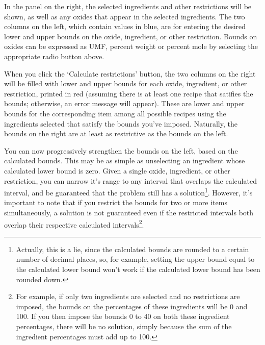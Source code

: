 \documentclass[a4paper,10pt]{article}
\begin{document}
In the panel on the right, the selected ingredients and other restrictions will be shown, as well as any oxides that appear in the selected ingredients. The two columns on the left, which contain values in blue, are for entering the desired lower and upper bounds on the oxide, ingredient, or other restriction. Bounds on oxides can be expressed as UMF, percent weight or percent mole by selecting the appropriate radio button above. 

When you click the `Calculate restrictions' button, the two columns on the right will be filled with lower and upper bounds for each oxide, ingredient, or other restriction, printed in red (assuming there is at least one recipe that satifies the bounds; otherwise, an error message will appear). These are lower and upper bounds for the corresponding item among all possible recipes using the ingredients selected that satisfy the bounds you've imposed. Naturally, the bounds on the right are at least as restrictive as the bounds on the left.

You can now progressively strengthen the bounds on the left, based on the calculated bounds. This may be as simple as unselecting an ingredient whose calculated lower bound is zero. Given a single oxide, ingredient, or other restriction, you can narrow it's range to any interval that overlaps the calculated interval, and be guaranteed that the problem still has a solution\footnote{Actually, this is a lie, since the calculated bounds are rounded to a certain number of decimal places, so, for example, setting the upper bound equal to the calculated lower bound won't work if the calculated lower bound has been rounded down.}. However, it's important to note that if you restrict the bounds for two or more items simultaneously, a solution is not guaranteed even if the restricted intervals both overlap their respective calculated intervals\footnote{For example, if only two ingredients are selected and no restrictions are imposed, the bounds on the percentages of these ingredients will be 0 and 100. If you then impose the bounds 0 to 40 on both these ingredient percentages, there will be no solution, simply because the sum of the ingredient percentages must add up to 100.}.
\end{document}
